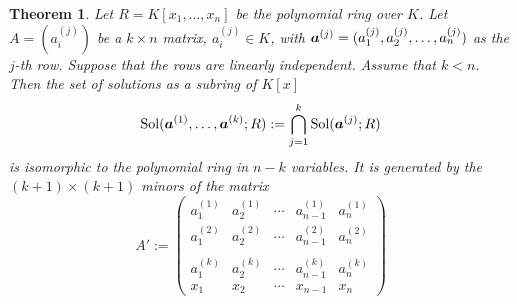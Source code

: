 \documentclass[12pt]{article}
\newtheorem{theorem}{Theorem}[section]
\theoremstyle{definition}
\theoremstyle{remark}
\def\cD{{\cal D}}
\def\sol{{\rm Sol}}
\def\bolda{\mbox{\boldmath $a$}}
\def\pa{\partial}
\begin{document}
\begin{theorem}  \label{subring_by_generated_by_determinates}   %
Let $R=K[x_1, \ldots, x_n]$ be the polynomial ring over $K$. 
Let $A=(a^{(j)}_i)$ be a $k \times n$ matrix, $a^{(j)}_i \in K$,  with 
$\bolda^{(j)}=(a^{(j)}_1, a^{(j)}_2, \ldots, a^{(j)}_n)$ as the $j$-th row. 
Suppose that the  rows are linearly independent.  
Assume that $k <  n$.  Then the set of solutions as a subring of $K[x]$ 
\[\sol(\bolda^{(1)}, \ldots, \bolda^{(k)}; R):=\bigcap _{j=1}^k \sol(\bolda^{(j)};R)\] 
is isomorphic to the polynomial ring in $n-k$ variables.  It is generated by 
the $(k+1) \times (k+1)$ minors of the matrix 
\[
A':=\left(\begin{array}{ccccc}
a^{(1)}_1  &  a^{(1)}_2 & \cdots  & a^{(1)}_{n-1} & a^{(1)}_n \\ 
a^{(2)}_1  &  a^{(2)}_2 & \cdots  & a^{(2)}_{n-1} & a^{(2)}_n \\ 
          &   &   &   &                                   \\
a^{(k)}_1  &  a^{(k)}_2 & \cdots  & a^{(k)}_{n-1} & a^{(k)}_n \\  
\hline 
x_1  & x_2   &  \cdots & x_{n-1}& x_n
\end{array}
\right)
\]  
\end{theorem}
\end{document}
